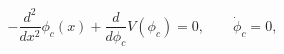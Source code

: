 \begin{equation}
\label{E2}
-\frac{d^2}{dx^2} \phi_c\left(x\right) +
\frac{d}{d\phi_c}V\left(\phi_c\right) =0, \qquad \dot\phi_c = 0,
\end{equation}

